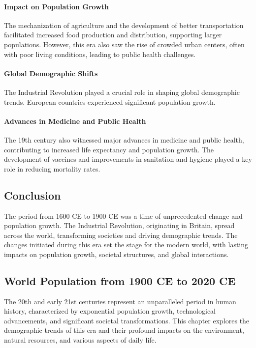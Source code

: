 \documentclass[a4paper,12pt]{book}
\begin{document}
\paragraph{Impact on Population Growth}
The mechanization of agriculture and the development of better transportation facilitated increased food production and distribution, supporting larger populations. However, this era also saw the rise of crowded urban centers, often with poor living conditions, leading to public health challenges.

\paragraph{Global Demographic Shifts}
The Industrial Revolution played a crucial role in shaping global demographic trends. European countries experienced significant population growth.

\paragraph{Advances in Medicine and Public Health}
The 19th century also witnessed major advances in medicine and public health, contributing to increased life expectancy and population growth. The development of vaccines and improvements in sanitation and hygiene played a key role in reducing mortality rates.

\subsection*{Conclusion}
The period from 1600 CE to 1900 CE was a time of unprecedented change and population growth. The Industrial Revolution, originating in Britain, spread across the world, transforming societies and driving demographic trends. The changes initiated during this era set the stage for the modern world, with lasting impacts on population growth, societal structures, and global interactions.

\subsection*{World Population from 1900 CE to 2020 CE}
The 20th and early 21st centuries represent an unparalleled period in human history, characterized by exponential population growth, technological advancements, and significant societal transformations. This chapter explores the demographic trends of this era and their profound impacts on the environment, natural resources, and various aspects of daily life.
\end{document}
